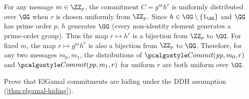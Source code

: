 \ifsolutions
\begin{mysolution}
  For any message $m \in \ZZ_p$, the commitment $C = g^m h^r$ is uniformly distributed over $\GG$ when $r$ is chosen uniformly from $\ZZ_p$.
  Since $h \in \GG \setminus \{1_\GG\}$ and $\GG$ has prime order $p$, $h$ generates $\GG$ (every non-identity element generates a prime-order group).
  Thus the map $r \mapsto h^r$ is a bijection from $\ZZ_p$ to $\GG$.
  For fixed $m$, the map $r \mapsto g^m h^r$ is also a bijection from $\ZZ_p$ to $\GG$.
  Therefore, for any two messages $m_0, m_1$, the distributions of $\algo{Commit}(\params, m_0, r)$ and $\algo{Commit}(\params, m_1, r)$ for uniform $r$ are both uniform over $\GG$.
\end{mysolution}
\fi

\begin{exercise}\label{ex:elgamal-hiding}
  Prove that ElGamal commitments are hiding under the DDH assumption (\autoref{thm:elgamal-hiding}).
\end{exercise}

